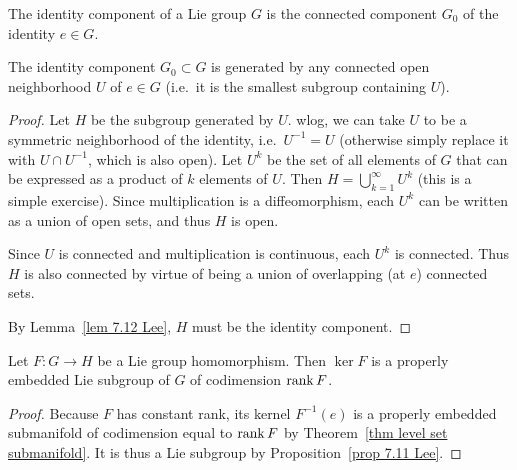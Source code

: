 \begin{defn}
    The identity component of a Lie group $G$ is the connected component $G_0$ of the identity $e\in G$.
\end{defn}

\begin{prop}\label{prop 7.14 Lee}
    The identity component $G_0\subset G$ is generated by any connected open neighborhood $U$ of $e\in G$ (i.e.~it is the smallest subgroup containing $U$).
\end{prop}
\begin{proof}
    Let $H$ be the subgroup generated by $U$. \gls{wlog}, we can take $U$ to be a symmetric neighborhood of the identity, i.e.~$U^{-1}=U$ (otherwise simply replace it with $U\cap U^{-1}$, which is also open). Let $U^k$ be the set of all elements of $G$ that can be expressed as a product of $k$ elements of $U$. Then $H=\bigcup_{k=1}^\infty U^k$ (this is a simple exercise). Since multiplication is a diffeomorphism, each $U^k$ can be written as a union of open sets, and thus $H$ is open.

    Since $U$ is connected and multiplication is continuous, each $U^k$ is connected. Thus $H$ is also connected by virtue of being a union of overlapping (at $e$) connected sets.

    By Lemma~\ref{lem 7.12 Lee}, $H$ must be the identity component.
\end{proof}


\begin{prop}
    Let $F:G\to H$ be a Lie group homomorphism. Then $\ker F$ is a properly embedded Lie subgroup of $G$ of codimension $\operatorname{rank} F$.
\end{prop}
\begin{proof}
    Because $F$ has constant rank, its kernel $F^{-1}(e)$ is a properly embedded submanifold of codimension equal to $\operatorname{rank} F$ by Theorem~\ref{thm level set submanifold}. It is thus a Lie subgroup by Proposition~\ref{prop 7.11 Lee}.
\end{proof}

